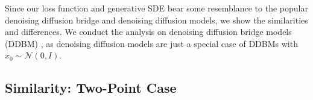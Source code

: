 \documentclass{article}
\begin{document}
Since our loss function and generative SDE bear some resemblance to the popular denoising diffusion bridge \cite{zhou2023denoising} and denoising diffusion \cite{song2020score} models, we show the similarities and differences.
We conduct the analysis on denoising diffusion bridge models (DDBM) \cite{zhou2023denoising}, as denoising diffusion models \cite{song2020score} are just a special case of DDBMs with $x_0 \sim \mathcal{N}(0, I)$.

\subsection{Similarity: Two-Point Case}
\end{document}

